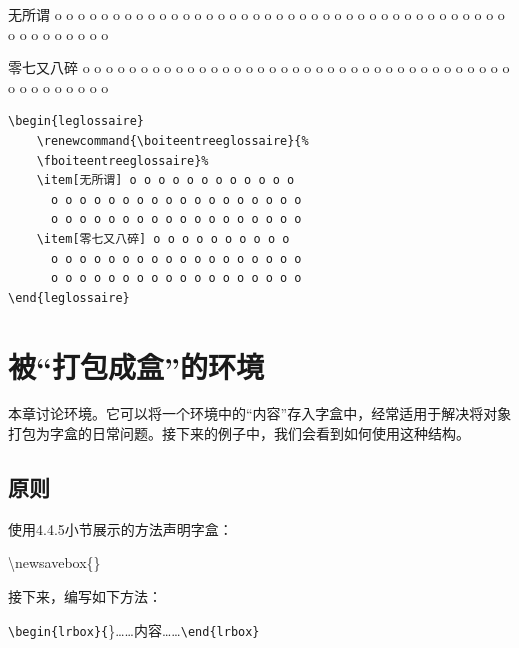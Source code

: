 \begin{codelist}[]{
    \begin{leglossaire}
        \renewcommand{\boiteentreeglossaire}{%
        \fboiteentreeglossaire}%
        \item[无所谓] o o o o o o o o o o o o
          o o o o o o o o o o o o o o o o o o
          o o o o o o o o o o o o o o o o o o
        \item[零七又八碎] o o o o o o o o o o
          o o o o o o o o o o o o o o o o o o
          o o o o o o o o o o o o o o o o o o
    \end{leglossaire}
}
\begin{verbatim}
\begin{leglossaire}
    \renewcommand{\boiteentreeglossaire}{%
    \fboiteentreeglossaire}% 
    \item[无所谓] o o o o o o o o o o o o
      o o o o o o o o o o o o o o o o o o
      o o o o o o o o o o o o o o o o o o
    \item[零七又八碎] o o o o o o o o o o
      o o o o o o o o o o o o o o o o o o
      o o o o o o o o o o o o o o o o o o
\end{leglossaire}\end{verbatim}
\end{codelist}

\section{被“打包成盒”的环境}

本章讨论环境。它可以将一个环境中的“内容”存入字盒中，经常适用于解决将对象打包为字盒的日常问题。接下来的例子中，我们会看到如何使用这种结构。

\subsection{原则}

使用4.4.5小节展示的方法声明字盒：

\begin{dmd}
\backslash newsavebox\{\}
\end{dmd}

接下来，编写如下方法：

\begin{dmd}
\verb|\begin{lrbox}{|\}……内容……\verb|\end{lrbox}|
\end{dmd}

